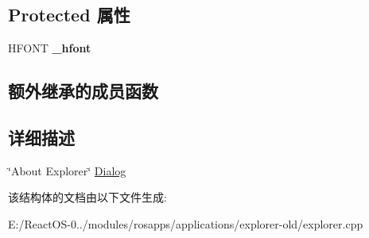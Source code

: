 \subsection*{Protected 属性}
\begin{DoxyCompactItemize}
\item 
\mbox{\label{struct_explorer_about_dlg_ad65f838a8d558d44e0246c2116f1526c}} 
H\+F\+O\+NT {\bfseries \+\_\+hfont}
\end{DoxyCompactItemize}
\subsection*{额外继承的成员函数}


\subsection{详细描述}
\char`\"{}\+About Explorer\char`\"{} \hyperlink{struct_dialog}{Dialog} 

该结构体的文档由以下文件生成\+:\begin{DoxyCompactItemize}
\item 
E\+:/\+React\+O\+S-\/0../modules/rosapps/applications/explorer-\/old/explorer.\+cpp\end{DoxyCompactItemize}
